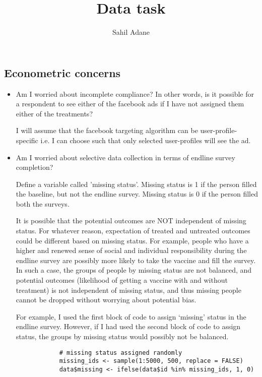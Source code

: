 \documentclass[11pt]{article}
\title{Data task}
\author{Sahil Adane}
\date{}
\begin{document}
	
	\allowdisplaybreaks
	\maketitle
	
	\subsection*{Econometric concerns} 
	
	\begin{itemize}
		
		\item 
		
		Am I worried about incomplete compliance? In other words, is it possible for a respondent to see either of the facebook ads if I have not assigned them either of the treatments? 
		
		I will assume that the facebook targeting algorithm can be user-profile-specific i.e. I can choose such that only selected user-profiles will see the ad. 
		
		\item 
		
		Am I worried about selective data collection in terms of endline survey completion? 
		
		Define a variable called 'missing status'. Missing status is 1 if the person filled the baseline, but not the endline survey. Missing status is 0 if the person filled both the surveys.
		
		It is possible that the potential outcomes are NOT independent of missing status. For whatever reason, expectation of treated and untreated outcomes could be different based on missing status. For example, people who have a higher and renewed sense of social and individual responsibility  during the endline survey are possibly more likely to take the vaccine and fill the survey. In such a case, the groups of people by missing status are not balanced, and potential outcomes (likelihood of getting a vaccine with and without treatment) is not independent of missing status, and thus missing people cannot be dropped without worrying about potential bias.
		
		For example, I used the first block of code to assign `missing' status in the endline survey. However, if I had used the second block of code to assign status, the groups by missing status would possibly not be balanced.
		
		\begin{verbatim}
			# missing status assigned randomly
			missing_ids <- sample(1:5000, 500, replace = FALSE)
			data$missing <- ifelse(data$id %in% missing_ids, 1, 0)
			

\end{verbatim}
\end{itemize}
\end{document}
